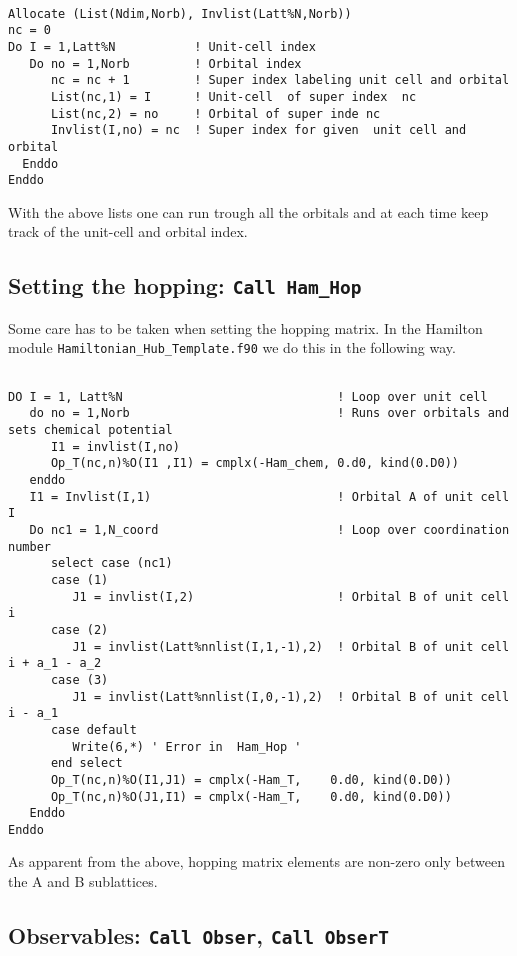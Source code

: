 \begin{lstlisting}

Allocate (List(Ndim,Norb), Invlist(Latt%N,Norb))
nc = 0
Do I = 1,Latt%N           ! Unit-cell index 
   Do no = 1,Norb         ! Orbital index
      nc = nc + 1         ! Super index labeling unit cell and orbital
      List(nc,1) = I      ! Unit-cell  of super index  nc
      List(nc,2) = no     ! Orbital of super inde nc
      Invlist(I,no) = nc  ! Super index for given  unit cell and orbital
  Enddo
Enddo

\end{lstlisting}

With the above lists one can run trough all the orbitals and at each time keep track of the unit-cell and orbital index.  

\subsection{Setting the hopping:  \texttt{Call Ham\_Hop} }

Some care has to be taken when setting the hopping matrix.    In the Hamilton module \texttt{Hamiltonian\_Hub\_Template.f90}   we do this in the following way. 

\begin{lstlisting}

DO I = 1, Latt%N                              ! Loop over unit cell 
   do no = 1,Norb                             ! Runs over orbitals and sets chemical potential
      I1 = invlist(I,no)  
      Op_T(nc,n)%O(I1 ,I1) = cmplx(-Ham_chem, 0.d0, kind(0.D0))
   enddo
   I1 = Invlist(I,1)                          ! Orbital A of unit cell I
   Do nc1 = 1,N_coord                         ! Loop over coordination  number
      select case (nc1)
      case (1)
         J1 = invlist(I,2)                    ! Orbital B of unit cell i
      case (2)
         J1 = invlist(Latt%nnlist(I,1,-1),2)  ! Orbital B of unit cell i + a_1 - a_2
      case (3)
         J1 = invlist(Latt%nnlist(I,0,-1),2)  ! Orbital B of unit cell i - a_1 
      case default
         Write(6,*) ' Error in  Ham_Hop '  
      end select
      Op_T(nc,n)%O(I1,J1) = cmplx(-Ham_T,    0.d0, kind(0.D0))   
      Op_T(nc,n)%O(J1,I1) = cmplx(-Ham_T,    0.d0, kind(0.D0))
   Enddo
Enddo

\end{lstlisting}
As apparent from the above, hopping matrix elements   are non-zero only between the A and B  sublattices. 


\subsection{Observables:  \texttt{Call Obser},   \texttt{Call ObserT}}

